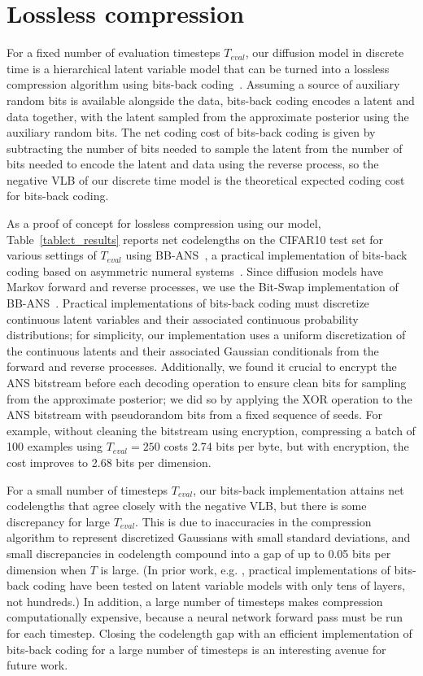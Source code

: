 \documentclass{article}
\begin{document}
\section{Lossless compression}
\label{sec:compression}
For a fixed number of evaluation timesteps $T_{eval}$, our diffusion model in discrete time is a hierarchical latent variable model that can be turned into a lossless compression algorithm using bits-back coding~\citep{hinton1993keeping}. Assuming a source of auxiliary random bits is available alongside the data, bits-back coding encodes a latent and data together, with the latent sampled from the approximate posterior using the auxiliary random bits. The net coding cost of bits-back coding is given by subtracting the number of bits needed to sample the latent from the number of bits needed to encode the latent and data using the reverse process, so the negative VLB of our discrete time model is the theoretical expected coding cost for bits-back coding.

As a proof of concept for lossless compression using our model, Table~\ref{table:t_results} reports net codelengths on the CIFAR10 test set for various settings of $T_{eval}$ using BB-ANS~\citep{townsend2018practical}, a practical implementation of bits-back coding based on asymmetric numeral systems~\citep{duda2009asymmetric}. Since diffusion models have Markov forward and reverse processes, we use the Bit-Swap implementation of BB-ANS~\citep{kingma2019bit}. Practical implementations of bits-back coding must discretize continuous latent variables and their associated continuous probability distributions; for simplicity, our implementation uses a uniform discretization of the continuous latents and their associated Gaussian conditionals from the forward and reverse processes. Additionally, we found it crucial to encrypt the ANS bitstream before each decoding operation to ensure clean bits for sampling from the approximate posterior; we did so by applying the XOR operation to the ANS bitstream with pseudorandom bits from a fixed sequence of seeds. For example, without cleaning the bitstream using encryption, compressing a batch of 100 examples using $T_{eval}=250$ costs 2.74 bits per byte, but with encryption, the cost improves to 2.68 bits per dimension.

For a small number of timesteps $T_{eval}$, our bits-back implementation attains net codelengths that agree closely with the negative VLB, but there is some discrepancy for large $T_{eval}$. This is due to inaccuracies in the compression algorithm to represent discretized Gaussians with small standard deviations, and small discrepancies in codelength  compound into a gap of up to 0.05 bits per dimension when $T$ is large. (In prior work, e.g. \citep{kingma2019bit,ho2019compression,townsend2020hilloc}, practical implementations of bits-back coding have been tested on latent variable models with only tens of layers, not hundreds.) In addition, a large number of timesteps makes compression computationally expensive, because a neural network forward pass must be run for each timestep. Closing the codelength gap with an efficient implementation of bits-back coding for a large number of timesteps is an interesting avenue for future work.
\end{document}
